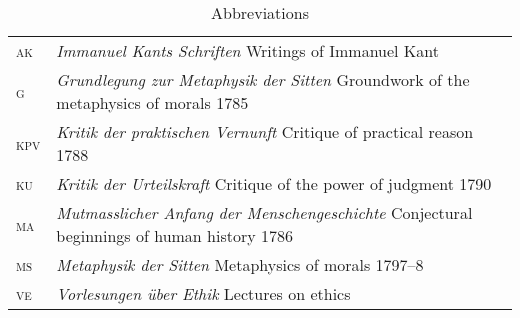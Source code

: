 \documentclass[12pt]{article}
\begin{document}
\begin{table}
	[ht] \setlength{\abovecaptionskip}{0pt} \setlength{\belowcaptionskip}{10pt} \caption{Abbreviations} 
	\begin{tabular*}
		{\textwidth}{lp{}}
	    \textsc{ak} & \emph{Immanuel Kants Schriften} Writings of Immanuel Kant\\
		\textsc{g} & \emph{Grundlegung zur Metaphysik der Sitten} Groundwork of the metaphysics of morals 1785\\
		\textsc{kpv} & \emph{Kritik der praktischen Vernunft} Critique of practical reason 1788\\
		\textsc{ku} & \emph{Kritik der Urteilskraft} Critique of the power of judgment 1790\\
		\textsc{ma} & \emph{Mutmasslicher Anfang der Menschengeschichte} Conjectural beginnings of human history 1786\\
		\textsc{ms} & \emph{Metaphysik der Sitten} Metaphysics of morals 1797--8\\
		\textsc{ve} & \emph{Vorlesungen \"uber Ethik} Lectures on ethics \\
	\end{tabular*}
\end{table}



 
 
\end{document}

